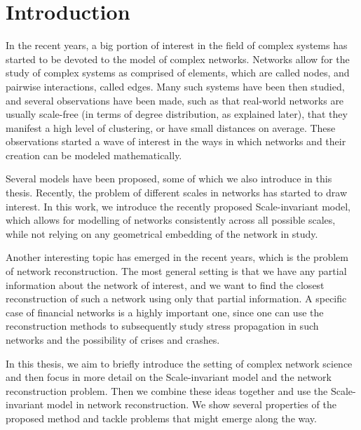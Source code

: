 \chapter*{Introduction} %
In the recent years, a big portion of interest in the field of complex systems has started to be devoted to the model of complex networks. Networks allow for the study of complex systems as comprised of elements, which are called nodes, and pairwise interactions, called edges. Many such systems have been then studied, and several observations have been made, such as that real-world networks are usually scale-free (in terms of degree distribution, as explained later), that they manifest a high level of clustering, or have small distances on average. These observations started a wave of interest in the ways in which networks and their creation can be modeled mathematically. 

Several models have been proposed, some of which we also introduce in this thesis. Recently, the problem of different scales in networks has started to draw interest. In this work, we introduce the recently proposed Scale-invariant model, which allows for modelling of networks consistently across all possible scales, while not relying on any geometrical embedding of the network in study.

Another interesting topic has emerged in the recent years, which is the problem of network reconstruction. The most general setting is that we have any partial information about the network of interest, and we want to find the closest reconstruction of such a network using only that partial information. A specific case of financial networks is a highly important one, since one can use the reconstruction methods to subsequently study stress propagation in such networks and the possibility of crises and crashes. 

In this thesis, we aim to briefly introduce the setting of complex network science and then focus in more detail on the Scale-invariant model and the network reconstruction problem. Then we combine these ideas together and use the Scale-invariant model in network reconstruction. We show several properties of the proposed method and tackle problems that might emerge along the way. 